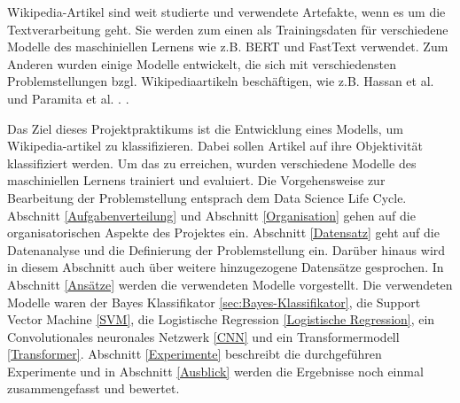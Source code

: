 Wikipedia-Artikel sind weit studierte und verwendete Artefakte, wenn es um die Textverarbeitung geht. Sie werden zum einen als Trainingsdaten für verschiedene Modelle des maschiniellen Lernens wie z.B. BERT \cite{BERTReference} und FastText \cite{DBLP:journals/corr/BojanowskiGJM16} verwendet. Zum Anderen wurden einige Modelle entwickelt, die sich mit verschiedensten Problemstellungen bzgl. Wikipediaartikeln beschäftigen, wie z.B. Hassan et al. \cite{shavarani2020multiclassmultilingualclassificationwikipedia} und Paramita et al. \cite{das2024languageagnosticmodelingwikipediaarticles}. .

Das Ziel dieses Projektpraktikums ist die Entwicklung eines Modells, um Wikipedia-artikel zu klassifizieren. Dabei sollen Artikel auf ihre Objektivität klassifiziert werden. Um das zu erreichen, wurden verschiedene Modelle des maschiniellen Lernens trainiert und evaluiert. Die Vorgehensweise zur Bearbeitung der Problemstellung entsprach dem Data Science Life Cycle. Abschnitt \ref{Aufgabenverteilung} und Abschnitt \ref{Organisation} gehen auf die organisatorischen Aspekte des Projektes ein. Abschnitt \ref{Datensatz} geht auf die Datenanalyse und die Definierung der Problemstellung ein. Darüber hinaus wird in diesem Abschnitt auch über weitere hinzugezogene Datensätze gesprochen. In Abschnitt \ref{Ansätze} werden die verwendeten Modelle vorgestellt. Die verwendeten Modelle waren der Bayes Klassifikator \ref{sec:Bayes-Klassifikator}, die Support Vector Machine \ref{SVM}, die Logistische Regression \ref{Logistische Regression}, ein Convolutionales neuronales Netzwerk \ref{CNN} und ein Transformermodell \ref{Transformer}. Abschnitt \ref{Experimente} beschreibt die durchgeführen Experimente und in Abschnitt \ref{Ausblick} werden die Ergebnisse noch einmal zusammengefasst und bewertet.

